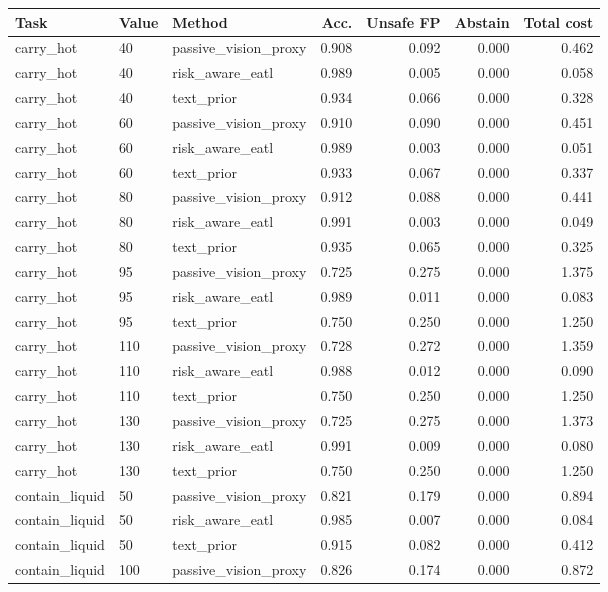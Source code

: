 \begin{tabular}{lllrrrr}
\toprule
Task & Value & Method & Acc. & Unsafe FP & Abstain & Total cost \\
\midrule
carry\_hot & 40 & passive\_vision\_proxy & 0.908 & 0.092 & 0.000 & 0.462 \\
carry\_hot & 40 & risk\_aware\_eatl & 0.989 & 0.005 & 0.000 & 0.058 \\
carry\_hot & 40 & text\_prior & 0.934 & 0.066 & 0.000 & 0.328 \\
carry\_hot & 60 & passive\_vision\_proxy & 0.910 & 0.090 & 0.000 & 0.451 \\
carry\_hot & 60 & risk\_aware\_eatl & 0.989 & 0.003 & 0.000 & 0.051 \\
carry\_hot & 60 & text\_prior & 0.933 & 0.067 & 0.000 & 0.337 \\
carry\_hot & 80 & passive\_vision\_proxy & 0.912 & 0.088 & 0.000 & 0.441 \\
carry\_hot & 80 & risk\_aware\_eatl & 0.991 & 0.003 & 0.000 & 0.049 \\
carry\_hot & 80 & text\_prior & 0.935 & 0.065 & 0.000 & 0.325 \\
carry\_hot & 95 & passive\_vision\_proxy & 0.725 & 0.275 & 0.000 & 1.375 \\
carry\_hot & 95 & risk\_aware\_eatl & 0.989 & 0.011 & 0.000 & 0.083 \\
carry\_hot & 95 & text\_prior & 0.750 & 0.250 & 0.000 & 1.250 \\
carry\_hot & 110 & passive\_vision\_proxy & 0.728 & 0.272 & 0.000 & 1.359 \\
carry\_hot & 110 & risk\_aware\_eatl & 0.988 & 0.012 & 0.000 & 0.090 \\
carry\_hot & 110 & text\_prior & 0.750 & 0.250 & 0.000 & 1.250 \\
carry\_hot & 130 & passive\_vision\_proxy & 0.725 & 0.275 & 0.000 & 1.373 \\
carry\_hot & 130 & risk\_aware\_eatl & 0.991 & 0.009 & 0.000 & 0.080 \\
carry\_hot & 130 & text\_prior & 0.750 & 0.250 & 0.000 & 1.250 \\
contain\_liquid & 50 & passive\_vision\_proxy & 0.821 & 0.179 & 0.000 & 0.894 \\
contain\_liquid & 50 & risk\_aware\_eatl & 0.985 & 0.007 & 0.000 & 0.084 \\
contain\_liquid & 50 & text\_prior & 0.915 & 0.082 & 0.000 & 0.412 \\
contain\_liquid & 100 & passive\_vision\_proxy & 0.826 & 0.174 & 0.000 & 0.872 \\

\end{tabular}
